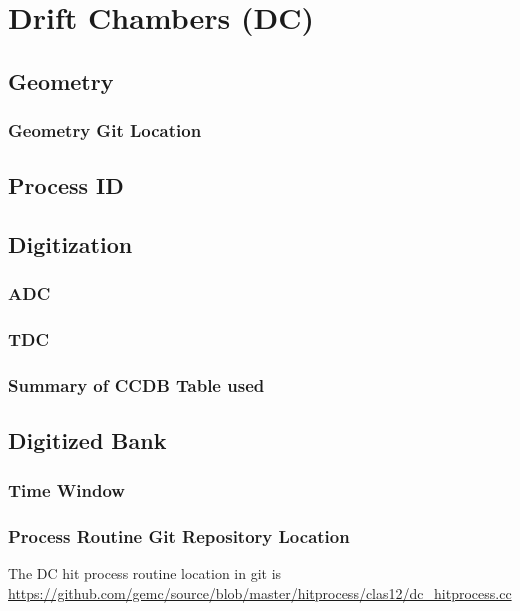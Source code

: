 \section{Drift Chambers (DC)}


\subsection{Geometry}

\subsubsection{Geometry Git Location}

\subsection{Process ID}

\subsection{Digitization}



\subsubsection{ADC}
\subsubsection{TDC}

\subsubsection{Summary of CCDB Table used}

\subsection{Digitized Bank}

\subsubsection{Time Window}

\subsubsection{Process Routine Git Repository Location}


The DC hit process routine location in git is \url{https://github.com/gemc/source/blob/master/hitprocess/clas12/dc_hitprocess.cc}

